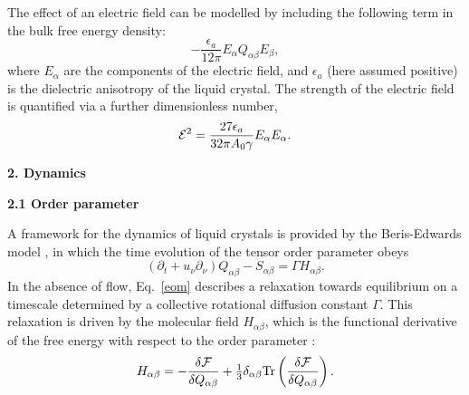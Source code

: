 \documentclass[12pt,twoside]{article}
\begin{document}
The effect of an electric field can be modelled by including the following
term in the bulk free energy density:
\begin{equation}
-\frac{\epsilon_a}{12\pi} E_{\alpha}Q_{\alpha\beta}E_{\beta},
\end{equation} 
where $E_{\alpha}$ are the components of the electric field, and 
$\epsilon_a$ (here assumed positive) is the dielectric anisotropy of the liquid
crystal. The strength of the electric field is quantified via
a further dimensionless number, 
\begin{equation}
{\cal E}^2 = \frac{27 \epsilon_a}{32 \pi A_0 \gamma} E_\alpha E_\alpha.
\end{equation}


{\bf 2. Dynamics}

{\bf 2.1 Order parameter}

A framework for the dynamics of liquid crystals is provided by the 
Beris-Edwards model \cite{beris}, in which the time evolution of the
tensor order parameter obeys
\begin{equation}
\label{eom}
\left(\partial_t+ u_\nu \partial_\nu \right) Q_{\alpha\beta} - S_{\alpha\beta}
= \Gamma H_{\alpha\beta}.
\end{equation}
In the absence of flow, Eq.~\ref{eom} describes a relaxation towards
equilibrium on a timescale determined by a collective rotational diffusion 
constant $\Gamma$. This relaxation is driven by the molecular field
$H_{\alpha\beta}$, which is the functional derivative of the free energy
with respect to the order parameter \cite{beris}:
\begin{equation}
H_{\alpha\beta} = -\frac{\delta {\cal F}} {\delta Q_{\alpha\beta}} 
+ {\textstyle \frac{1}{3}} \delta_{\alpha\beta} 
\mathrm{Tr}\left(\frac{\delta {\cal F}}{\delta Q_{\alpha\beta}}\right).
\end{equation}
\end{document}
